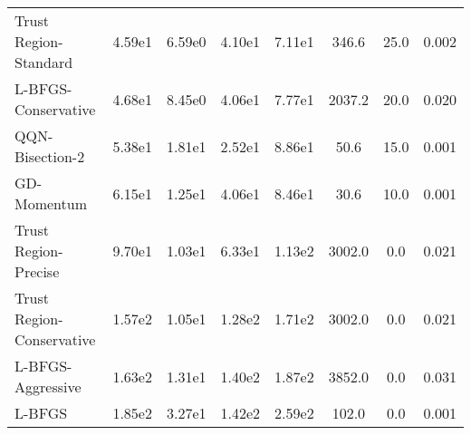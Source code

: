 \documentclass{article}
\begin{document}
\begin{table}[htbp]
{\begin{tabular}{p{2.5cm}*{7}{c}}
Trust Region-Standard & 4.59e1 & 6.59e0 & 4.10e1 & 7.11e1 & 346.6 & 25.0 & 0.002 \\
L-BFGS-Conservative & 4.68e1 & 8.45e0 & 4.06e1 & 7.77e1 & 2037.2 & 20.0 & 0.020 \\
QQN-Bisection-2 & 5.38e1 & 1.81e1 & 2.52e1 & 8.86e1 & 50.6 & 15.0 & 0.001 \\
GD-Momentum & 6.15e1 & 1.25e1 & 4.06e1 & 8.46e1 & 30.6 & 10.0 & 0.001 \\
Trust Region-Precise & 9.70e1 & 1.03e1 & 6.33e1 & 1.13e2 & 3002.0 & 0.0 & 0.021 \\
Trust Region-Conservative & 1.57e2 & 1.05e1 & 1.28e2 & 1.71e2 & 3002.0 & 0.0 & 0.021 \\
L-BFGS-Aggressive & 1.63e2 & 1.31e1 & 1.40e2 & 1.87e2 & 3852.0 & 0.0 & 0.031 \\
L-BFGS & 1.85e2 & 3.27e1 & 1.42e2 & 2.59e2 & 102.0 & 0.0 & 0.001 \\
\bottomrule
\end{tabular}
}
\end{table}
\end{document}

